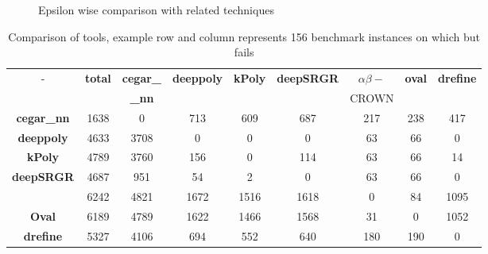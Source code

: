

\begin{figure}[t]

    \caption{Epsilon wise comparison with related techniques}
    \label{res:ep:milp_with_milp}
\end{figure}

\begin{table}[b]
  \footnotesize
    \centering
    \begin{tabular}{|c|c|c|c|c|c|c|c|c|}
        \hline
      - & \textbf{total} & \textbf{cegar\_} & \textbf{deeppoly} & \textbf{kPoly} & \textbf{deepSRGR} & $\alpha \beta-$ & \textbf{oval} & \textbf{drefine} \\
        &     & \textbf{\_nn}& & & & \textsc{CROWN}& & \\
        \hline
        \textbf{cegar\_nn} & 1638 & 0 & 713 & 609 & 687 & 217 & 238 & 417 \\ 
        \hline
        \textbf{deeppoly} & 4633 & 3708 & 0 & 0 & 0 & 63 & 66 & 0  \\ 
        \hline
        \textbf{kPoly} & 4789 & 3760 & 156 & 0 & 114 & 63 & 66 & 14  \\ 
        \hline
        \textbf{deepSRGR} & 4687 & 951 & 54 & 2 & 0 & 63 & 66 & 0 \\ 
        \hline
        \alphabeta{} & 6242 & 4821 & 1672 & 1516 & 1618 & 0 & 84 & 1095  \\
        \hline
        \textbf{Oval} & 6189 & 4789 & 1622 & 1466 & 1568 & 31 & 0 & 1052 \\
        \hline
        \textbf{drefine} & 5327 & 4106 & 694 & 552 & 640 & 180 & 190 & 0  \\
        \hline
    \end{tabular}
    \caption{Comparison of tools, example row \kpoly{} and column \deeppoly{} represents 156 benchmark instances on which \kpoly{} but \deeppoly{} fails}
    \label{tb:matrix}
\end{table}




